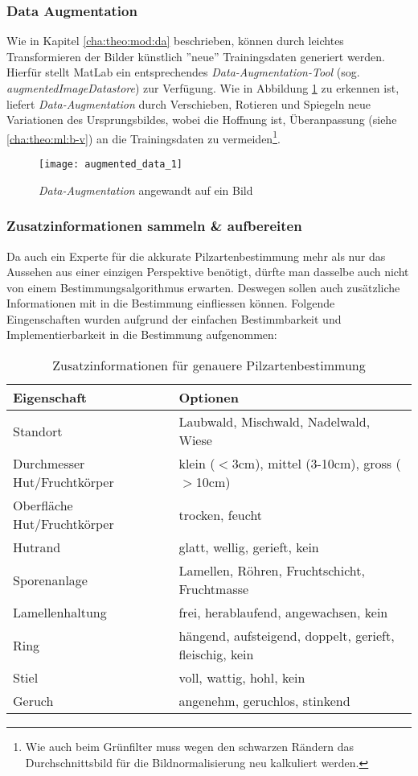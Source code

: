 \subsubsection{Data Augmentation}
Wie in Kapitel \ref{cha:theo:mod:da} beschrieben, können durch leichtes Transformieren der Bilder künstlich ''neue'' Trainingsdaten generiert werden. Hierfür stellt MatLab ein entsprechendes \textit{Data-Augmentation-Tool} (sog. \textit{augmentedImageDatastore}) zur Verfügung. Wie in Abbildung \ref{img:da} zu erkennen ist, liefert \textit{Data-Augmentation} durch Verschieben, Rotieren und Spiegeln neue Variationen des Ursprungsbildes, wobei die Hoffnung ist, Überanpassung (siehe \ref{cha:theo:ml:b-v}) an die Trainingsdaten zu vermeiden\footnote{Wie auch beim Grünfilter muss wegen den schwarzen Rändern das Durchschnittsbild für die Bildnormalisierung neu kalkuliert werden.}.

\begin{figure}[h]
	\centering
	\texttt{[image: augmented\_data\_1]}
	\caption[Beispiel zu \textit{Data-Augmentation}]{\textit{Data-Augmentation} angewandt auf ein Bild}
	\label{img:da}
\end{figure}

\subsubsection{Zusatzinformationen sammeln \& aufbereiten} \label{cha:met:einf}
Da auch ein Experte für die akkurate Pilzartenbestimmung mehr als nur das Aussehen aus einer einzigen Perspektive benötigt, dürfte man dasselbe auch nicht von einem Bestimmungsalgorithmus erwarten. Deswegen sollen auch zusätzliche Informationen mit in die Bestimmung einfliessen können. Folgende Eingenschaften wurden aufgrund der einfachen Bestimmbarkeit und Implementierbarkeit in die Bestimmung aufgenommen:

\begin{table}[!htb]
	\def\arraystretch{1.2}
	\centering
	\begin{tabular}[t]{l | l }
		Eigenschaft & Optionen\\
		\hline
		Standort & Laubwald, Mischwald, Nadelwald, Wiese\\
		Durchmesser Hut/Fruchtkörper & klein ($<$3cm), mittel (3-10cm), gross ($>$10cm)\\
		Oberfläche Hut/Fruchtkörper & trocken, feucht\\
		Hutrand & glatt, wellig, gerieft, kein\\
		Sporenanlage & Lamellen, Röhren, Fruchtschicht, Fruchtmasse\\
		Lamellenhaltung & frei, herablaufend, angewachsen, kein\\
		Ring & hängend, aufsteigend, doppelt, gerieft, fleischig, kein\\
		Stiel & voll, wattig, hohl, kein\\
		Geruch & angenehm, geruchlos, stinkend
	\end{tabular}
	\caption{Zusatzinformationen für genauere Pilzartenbestimmung}
	\label{table:extra_inf}
\end{table}

